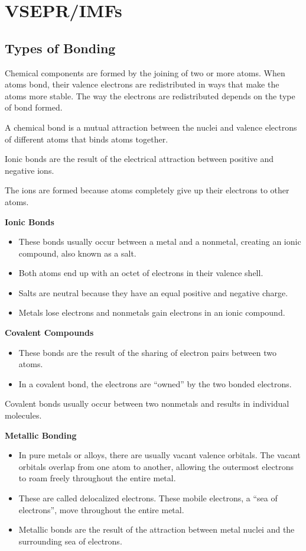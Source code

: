 \documentclass[../hchem.tex]{subfiles}
\begin{document}
\chapter{VSEPR/IMFs}

\section{Types of Bonding}
Chemical components are formed by the joining of two or more atoms. When atoms bond, their 
valence electrons are redistributed in ways that make the atoms more stable. The way the electrons are redistributed depends on the type of bond formed.

A chemical bond is a mutual attraction between the nuclei and valence electrons of different atoms that binds atoms together.

Ionic bonds are the result of the electrical attraction between positive and negative ions.

The ions are formed because atoms completely give up their electrons to other atoms.

\textbf{Ionic Bonds}
\begin{itemize}
    \item These bonds usually occur between a metal and a nonmetal, creating an ionic compound, also known as a salt.
    \item Both atoms end up with an octet of electrons in their valence shell.
    \item Salts are neutral because they have an equal positive and negative charge.
    \item Metals lose electrons and nonmetals gain electrons in an ionic compound.
\end{itemize}

\textbf{Covalent Compounds}
\begin{itemize}
    \item These bonds are the result of the sharing of electron pairs between two atoms.
    \item In a covalent bond, the electrons are ``owned'' by the two bonded electrons.
\end{itemize}

Covalent bonds usually occur between two nonmetals and results in individual molecules.

\textbf{Metallic Bonding}
\begin{itemize}
    \item In pure metals or alloys, there are usually vacant valence orbitals. The vacant orbitals overlap from one atom to another, allowing the outermost electrons to roam freely throughout the entire metal.
    \item These are called delocalized electrons. These mobile electrons, a ``sea of electrons'', move throughout the entire metal.
    \item Metallic bonds are the result of the attraction between metal nuclei and the surrounding sea of electrons.
\end{itemize}
\end{document}
